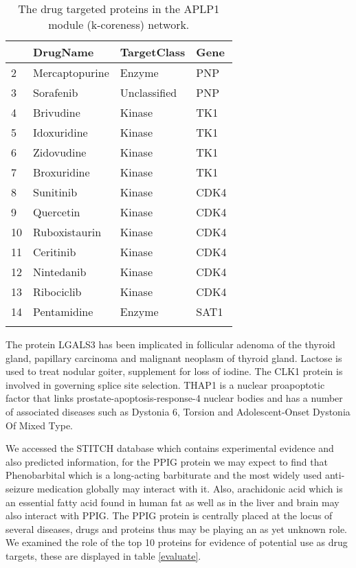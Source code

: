 \documentclass[a4paper,8pt,twocolumn,5p]{elsarticle}
\begin{document}
\begin{table}[h]
\centering \scriptsize \caption{The drug targeted proteins in the APLP1 module (k-coreness) network.}
\label{APLP1core}
\begin{tabular}{llll}
  \hline
 & DrugName & TargetClass & Gene \\ 
  \hline
2 & Mercaptopurine & Enzyme & PNP \\ 
  3 & Sorafenib & Unclassified & PNP \\ 
  4 & Brivudine & Kinase & TK1 \\ 
  5 & Idoxuridine & Kinase & TK1 \\ 
  6 & Zidovudine & Kinase & TK1 \\ 
  7 & Broxuridine & Kinase & TK1 \\ 
  8 & Sunitinib & Kinase & CDK4 \\ 
  9 & Quercetin & Kinase & CDK4 \\ 
  10 & Ruboxistaurin & Kinase & CDK4 \\ 
  11 & Ceritinib & Kinase & CDK4 \\ 
  12 & Nintedanib & Kinase & CDK4 \\ 
  13 & Ribociclib & Kinase & CDK4 \\ 
  14 & Pentamidine & Enzyme & SAT1 \\ 
   \hline \normalsize
\end{tabular}
\end{table}

The protein LGALS3 has been implicated in follicular adenoma of the thyroid gland, papillary carcinoma and malignant neoplasm of thyroid gland. Lactose is used to treat nodular goiter, supplement for loss of iodine. The CLK1 protein is involved in governing splice site selection. THAP1 is a nuclear proapoptotic factor that links prostate-apoptosis-response-4 nuclear bodies and has a number of associated diseases such as Dystonia 6, Torsion and Adolescent-Onset Dystonia Of Mixed Type. 

We accessed the STITCH database which contains experimental evidence and also predicted information, for the PPIG protein we may expect to find that Phenobarbital which is a long-acting barbiturate and the most widely used anti-seizure medication globally may interact with it. Also, arachidonic acid which is an essential fatty acid found in human fat as well as in the liver and brain may also interact with PPIG. The PPIG protein is centrally placed at the locus of several diseases, drugs and proteins thus may be playing an as yet unknown role. We examined the role of the top 10 proteins for evidence of potential use as drug targets, these are displayed in table \ref{evaluate}.
\end{document}
